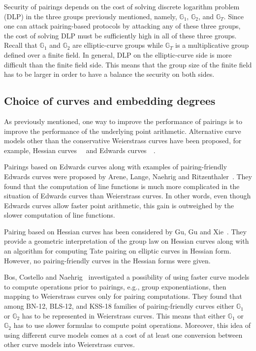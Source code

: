 Security of pairings depends on the cost of solving discrete logarithm problem (DLP) in the three groups previously mentioned,
namely, $\mathbb{G}_1$, $\mathbb{G}_2$, and $\mathbb{G}_T$.
Since one can attack pairing-based protocols by attacking any of these three groups,
the cost of solving DLP must be sufficiently high in all of these three groups.
Recall that $\mathbb{G}_1$ and $\mathbb{G}_2$ are elliptic-curve groups
while $\mathbb{G}_T$ is a multiplicative group defined over a finite field.
In general, DLP on the elliptic-curve side is more difficult than the finite field side.
This means that the group size of the finite field has to be larger in order to have a balance the security on both sides.


\subsection{Choice of curves and embedding degrees}

As previously mentioned, one way to improve the performance of pairings is
to improve the performance of the underlying point arithmetic.
Alternative curve models other than the conservative Weierstrass curves have been proposed,
for example, Hessian curves~\cite{2001/smart}~\cite{2001/joye} and
Edwards curves~\cite{2007/edwards}~\cite{2007/bernstein-newelliptic}.

Pairings based on Edwards curves
along with examples of pairing-friendly Edwards curves
were proposed by Arene, Lange, Naehrig and Ritzenthaler~\cite{2009/fastertate}.
They found that the computation of line functions is much more complicated in the situation of Edwards curves than Weierstrass curves.
In other words,
even though Edwards curves allow faster point arithmetic,
this gain is outweighed by the slower computation of line functions.

Pairing based on Hessian curves has been considered by Gu, Gu and Xie~\cite{2010/Gu}.
They provide a geometric interpretation of the group law on Hessian curves
along with an algorithm for computing Tate pairing on elliptic curves in Hessian form.
However, no pairing-friendly curves in the Hessian forms were given.

Bos, Costello and Naehrig~\cite{2013/bos-pairing} investigated a possibility of
using faster curve models to compute operations prior to pairings, e.g., group exponentiations,
then mapping to Weierstrass curves only for pairing computations.
They found that among BN-12, BLS-12, and KSS-18 families of pairing-friendly curves
either $\mathbb{G}_1$ or $\mathbb{G}_2$ has to be represented in Weierstrass curves.
This means that either $\mathbb{G}_1$ or $\mathbb{G}_2$ has to use slower formulas to compute point operations.
Moreover, this idea of using different curve models comes at a cost of at least one conversion
between other curve models into Weierstrass curves.

